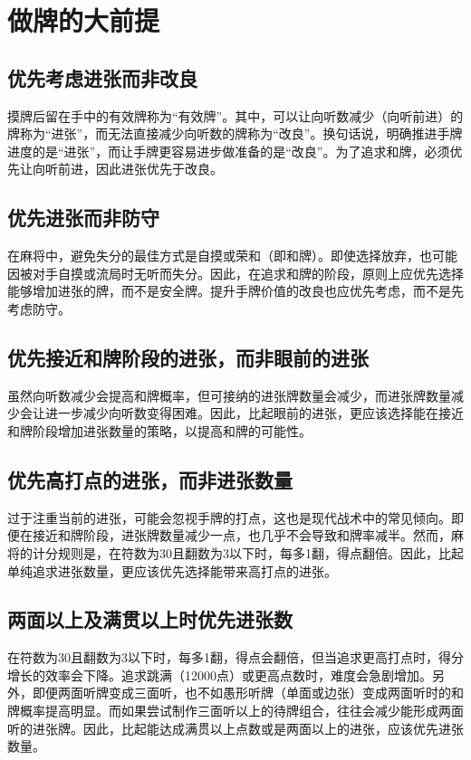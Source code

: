 \chapter{做牌的大前提}
\section{优先考虑进张而非改良}\label{lec1:做牌法则1}

摸牌后留在手中的有效牌称为“有效牌”。其中，可以让向听数减少（向听前进）的牌称为“进张”，而无法直接减少向听数的牌称为“改良”。换句话说，明确推进手牌进度的是“进张”，而让手牌更容易进步做准备的是“改良”。为了追求和牌，必须优先让向听前进，因此进张优先于改良。

\section{优先进张而非防守}\label{lec1:做牌法则2}
在麻将中，避免失分的最佳方式是自摸或荣和（即和牌）。即使选择放弃，也可能因被对手自摸或流局时无听而失分。因此，在追求和牌的阶段，原则上应优先选择能够增加进张的牌，而不是安全牌。提升手牌价值的改良也应优先考虑，而不是先考虑防守。

\section{优先接近和牌阶段的进张，而非眼前的进张}\label{lec1:做牌法则3}
虽然向听数减少会提高和牌概率，但可接纳的进张牌数量会减少，而进张牌数量减少会让进一步减少向听数变得困难。因此，比起眼前的进张，更应该选择能在接近和牌阶段增加进张数量的策略，以提高和牌的可能性。

\section{优先高打点的进张，而非进张数量}\label{lec1:做牌法则4}
过于注重当前的进张，可能会忽视手牌的打点，这也是现代战术中的常见倾向。即便在接近和牌阶段，进张牌数量减少一点，也几乎不会导致和牌率减半。然而，麻将的计分规则是，在符数为30且翻数为3以下时，每多1翻，得点翻倍。因此，比起单纯追求进张数量，更应该优先选择能带来高打点的进张。

\section{两面以上及满贯以上时优先进张数}\label{lec1:做牌法则5}
在符数为30且翻数为3以下时，每多1翻，得点会翻倍，但当追求更高打点时，得分增长的效率会下降。追求跳满（12000点）或更高点数时，难度会急剧增加。另外，即便两面听牌变成三面听，也不如愚形听牌（单面或边张）变成两面听时的和牌概率提高明显。而如果尝试制作三面听以上的待牌组合，往往会减少能形成两面听的进张牌。因此，比起能达成满贯以上点数或是两面以上的进张，应该优先进张数量。